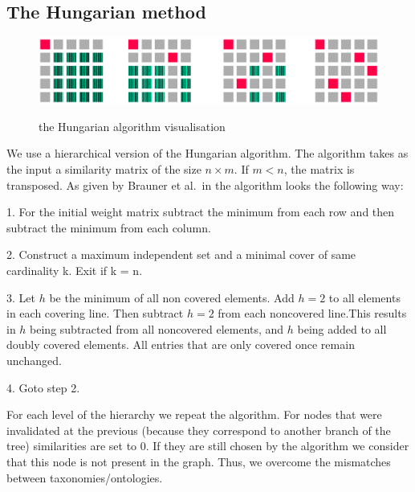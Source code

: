 \documentclass[11pt,a4paper]{article}
\begin{document}
\subsection{The Hungarian method}
\begin{figure}

	\centering
	\small
	\includegraphics[scale=0.3]{hungarian}\\

	\caption{the Hungarian algorithm visualisation}
	\label{hungarian}
\end{figure}
We use a hierarchical version of the Hungarian algorithm. The algorithm takes as the input a similarity matrix of the size $n \times m$. If $m < n$, the matrix is transposed. As given by Brauner et al.\ in \citeyear{hungarian-listing} the algorithm looks the following way:

1. For the initial weight matrix subtract the minimum from each row and then subtract the minimum from each column.

2. Construct a maximum independent set and a minimal cover of same cardinality k. Exit if k = n.

3. Let $h$ be the minimum of all non covered elements. Add $h=2$ to all elements in each covering line. Then subtract $h=2$ from each noncovered line.This results in $h$ being subtracted from all noncovered elements, and $h$ being added to all doubly covered elements. All entries that are only covered once remain unchanged.

4. Goto step 2.

For each level of the hierarchy we repeat the algorithm. For nodes that were invalidated at the previous (because they correspond to another branch of the tree) similarities are set to 0. If they are still chosen by the algorithm we consider that this node is not present in the graph. Thus, we overcome the mismatches between taxonomies/ontologies.
%
\end{document}
